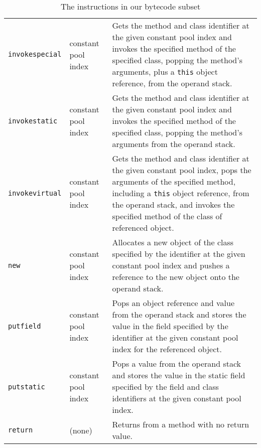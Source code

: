 \begin{table}
\begin{tabular}{llp{8.5cm}}
    \\
    \texttt{invokespecial} & constant pool index &
    Gets the method and class identifier at the given constant pool
    index and invokes the specified method of the specified class,
    popping the method's arguments, plus a \texttt{this} object
    reference, from the operand stack.
    \\
    \texttt{invokestatic} & constant pool index &
    Gets the method and class identifier at the given constant pool
    index and invokes the specified method of the specified class,
    popping the method's arguments from the operand stack.
    \\
    \texttt{invokevirtual} & constant pool index &
    Gets the method and class identifier at the given constant pool
    index, pops the arguments of the specified method, including a
    \texttt{this} object reference, from the operand stack, and
    invokes the specified method of the class of referenced object.
    \\
    \texttt{new} & constant pool index &
    Allocates a new object of the class specified by the identifier at
    the given constant pool index and pushes a reference to the new
    object onto the operand stack.
    \\
    \texttt{putfield} & constant pool index &
    Pops an object reference and value from the operand stack and
    stores the value in the field specified by the identifier at the
    given constant pool index for the referenced object.
    \\
    \texttt{putstatic} & constant pool index &
    Pops a value from the operand stack and stores the value in the
    static field specified by the field and class identifiers at the
    given constant pool index.
    \\
    \texttt{return} & (none) &
    Returns from a method with no return value.
    \\
    \hline
  \end{tabular}
  \caption{The instructions in our bytecode subset}
  \label{bytecode-subset-table}
\end{table}

